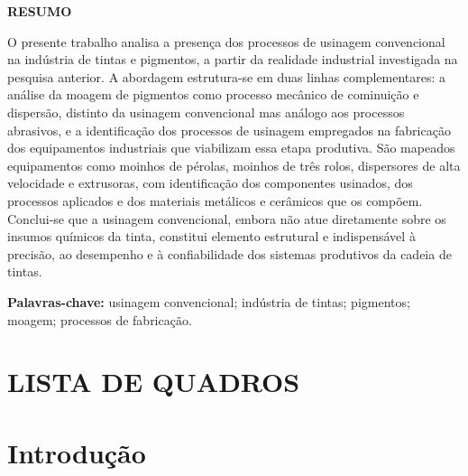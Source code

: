 \documentclass[
  12pt,
  a4paper,
  oneside,
  brazil,
  chapter=TITLE
]{article}
\makeatletter
\newcommand{\secbreak}{\clearpage}
\let\oldsection\section
\renewcommand{\section}{\secbreak\oldsection}
\renewcommand{\listofquadros}{%
  \section*{LISTA DE QUADROS}%
  \@starttoc{loq}%
}
\makeatother
\begin{document}
\clearpage
\thispagestyle{empty}
\begin{center}
  {\normalsize\bfseries RESUMO}
\end{center}

\vspace{1em}
\noindent
O presente trabalho analisa a presença dos processos de usinagem convencional
na indústria de tintas e pigmentos, a partir da realidade industrial
investigada na pesquisa anterior. A abordagem estrutura-se em duas linhas
complementares: a análise da moagem de pigmentos como processo mecânico de
cominuição e dispersão, distinto da usinagem convencional mas análogo aos
processos abrasivos, e a identificação dos processos de usinagem empregados na
fabricação dos equipamentos industriais que viabilizam essa etapa produtiva.
São mapeados equipamentos como moinhos de pérolas, moinhos de três rolos,
dispersores de alta velocidade e extrusoras, com identificação dos componentes
usinados, dos processos aplicados e dos materiais metálicos e cerâmicos que os
compõem. Conclui-se que a usinagem convencional, embora não atue diretamente
sobre os insumos químicos da tinta, constitui elemento estrutural e
indispensável à precisão, ao desempenho e à confiabilidade dos sistemas
produtivos da cadeia de tintas.

\vspace{1em}
\noindent\textbf{Palavras-chave:} usinagem convencional; indústria de tintas;
pigmentos; moagem; processos de fabricação.

\clearpage
\thispagestyle{empty}
\listofquadros

\clearpage
\thispagestyle{empty}
\tableofcontents


\section{Introdução}
\end{document}

